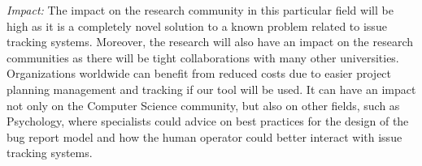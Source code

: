 \documentclass[11pt,english,twocolumn]{article}
\begin{document}
\emph{Impact:} The impact on the research community in this particular field will be high as 
it is a completely novel solution to a known problem related to issue tracking systems. Moreover,
the research will also have an impact on the research communities as there will be tight 
collaborations with many other universities. Organizations worldwide can benefit from reduced 
costs due to easier project planning management and tracking if our tool will be used. 
It can have an impact not only on the Computer Science community, but also on other fields,
such as Psychology, where specialists could advice on best practices for the design of the 
bug report model and how the human operator could better interact with issue tracking systems.

\let\oldbibliography\thebibliography
\renewcommand{\thebibliography}[1]{\oldbibliography{#1}
\setlength{\itemsep}{-3pt}}


{
\scriptsize

}
\end{document}
